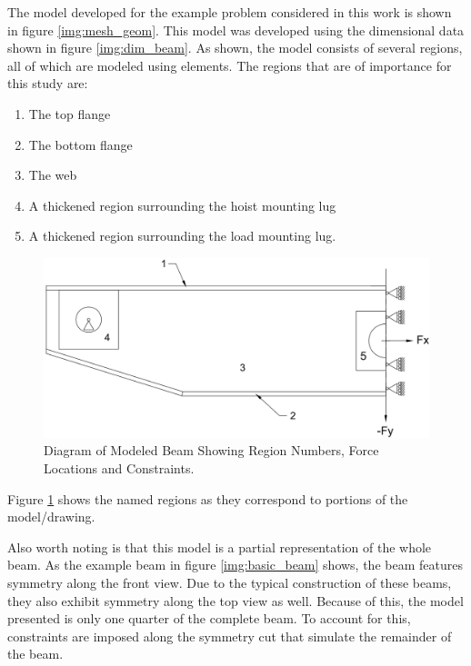 The model developed for the example problem considered in this work is shown in figure \ref{img:mesh_geom}. This model was developed using the dimensional data shown in figure \ref{img:dim_beam}. As shown, the model consists of several regions, all of which are modeled using  elements. The regions that are of importance for this study are: 

\begin{enumerate}
  \item The top flange
  \item The bottom flange
  \item The web
  \item A thickened region surrounding the hoist mounting lug
  \item A thickened region surrounding the load mounting lug. 
\end{enumerate}

\begin{figure}
\includegraphics[width=\textwidth]{img/numbered_geom.png}
\caption[Diagram of Modeled Beam]{Diagram of Modeled Beam Showing Region Numbers, Force Locations and Constraints.}
\label{img:num_geom}
\end{figure}

Figure \ref{img:num_geom} shows the named regions as they correspond to portions of the model/drawing. 

Also worth noting is that this model is a partial representation of the whole beam. As the example beam in figure \ref{img:basic_beam} shows, the beam features symmetry along the front view. Due to the typical construction of these beams, they also exhibit symmetry along the top view as well. Because of this, the model presented is only one quarter of the complete beam. To account for this, constraints are imposed along the symmetry cut that simulate the remainder of the beam. 

